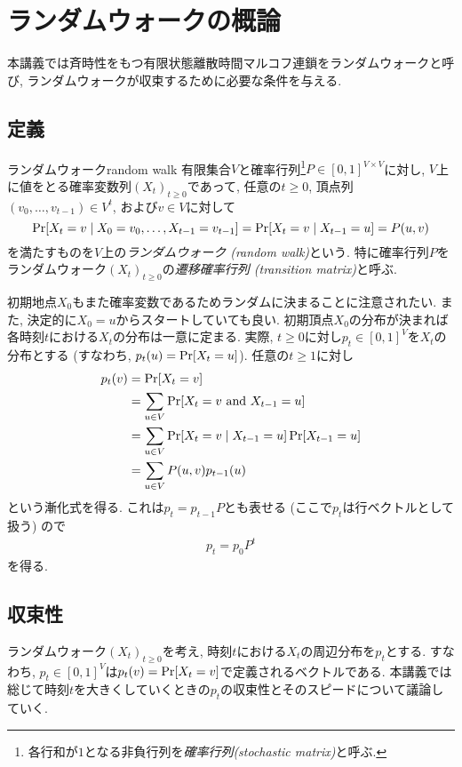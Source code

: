 \chapter{ランダムウォークの概論}
本講義では斉時性をもつ有限状態離散時間マルコフ連鎖をランダムウォークと呼び,
ランダムウォークが収束するために必要な条件を与える.

\section{定義}
%
\begin{definition}{ランダムウォーク}{random walk}
  有限集合$V$と確率行列\footnote{各行和が$1$となる非負行列を\emph{確率行列(stochastic matrix)}と呼ぶ.}$P\in[0,1]^{V\times V}$に対し,
  $V$上に値をとる確率変数列$(X_t)_{t\ge 0}$であって, 任意の$t\ge 0$, 頂点列$(v_0,\dots,v_{t-1})\in V^t$,
  および$v\in V$に対して
  \[
    \Pr\sbra*{X_t = v \condition X_0 = v_0,\dots,X_{t-1} = v_{t-1}} = \Pr\sbra*{X_t = v \condition X_{t-1} = u} = P(u,v)
  \]
  を満たすものを$V$上の\emph{ランダムウォーク (random walk)}という.
  特に確率行列$P$をランダムウォーク$(X_t)_{t\ge 0}$の\emph{遷移確率行列 (transition matrix)}と呼ぶ.
\end{definition}
%
初期地点$X_0$もまた確率変数であるためランダムに決まることに注意されたい.
また, 決定的に$X_0=u$からスタートしていても良い.
%
初期頂点$X_0$の分布が決まれば各時刻$t$における$X_t$の分布は一意に定まる.
実際, $t\ge 0$に対し$p_t \in [0,1]^{V}$を$X_t$の分布とする
(すなわち, $p_t(u) = \Pr\sbra*{X_t = u}$).
任意の$t\ge 1$に対し
\begin{align*}
  p_t(v) & = \Pr\sbra*{X_t = v}                                                             \\
         & = \sum_{u\in V}\Pr\sbra*{ X_t = v \tand X_{t-1} = u}                             \\
         & = \sum_{u\in V}\Pr\sbra*{ X_t = v \condition X_{t-1} = u} \Pr\sbra*{X_{t-1} = u} \\
         & = \sum_{u\in V} P(u,v) p_{t-1}(u)
\end{align*}
という漸化式を得る.
これは$p_{t} = p_{t-1} P$とも表せる (ここで$p_t$は行ベクトルとして扱う) ので
\begin{align}
  p_t = p_0 P^t \label{eq:p_t}
\end{align}
を得る.

\section{収束性}
ランダムウォーク$(X_t)_{t\ge 0}$を考え, 時刻$t$における$X_t$の周辺分布を$p_t$とする.
すなわち, $p_t \in [0,1]^V$は$p_t(v) = \Pr\lbrack X_t = v\rbrack$で定義されるベクトルである.
本講義では総じて時刻$t$を大きくしていくときの$p_t$の収束性とそのスピードについて議論していく.

